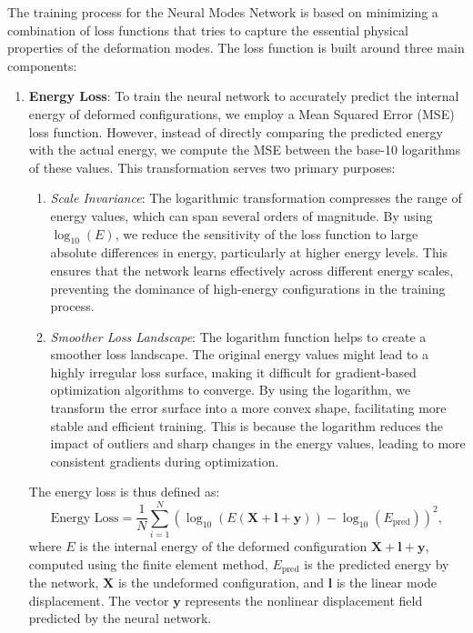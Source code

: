 The training process for the Neural Modes Network is based on minimizing a combination of loss functions that tries to capture the essential physical properties of the deformation modes. The loss function is built around three main components:
\begin{enumerate}
    \item \textbf{Energy Loss}: To train the neural network to accurately predict the internal energy of deformed configurations, we employ a Mean Squared Error (MSE) loss function.  However, instead of directly comparing the predicted energy with the actual energy, we compute the MSE between the base-10 logarithms of these values. This transformation serves two primary purposes:

    \begin{enumerate}
        \item \textit{Scale Invariance}:  The logarithmic transformation compresses the range of energy values, which can span several orders of magnitude. By using $\log_{10}(E)$, we reduce the sensitivity of the loss function to large absolute differences in energy, particularly at higher energy levels. This ensures that the network learns effectively across different energy scales, preventing the dominance of high-energy configurations in the training process.

        \item \textit{Smoother Loss Landscape}: The logarithm function helps to create a smoother loss landscape.  The original energy values might lead to a highly irregular loss surface, making it difficult for gradient-based optimization algorithms to converge. By using the logarithm, we transform the error surface into a more convex shape, facilitating more stable and efficient training.  This is because the logarithm reduces the impact of outliers and sharp changes in the energy values, leading to more consistent gradients during optimization.
    \end{enumerate}

    The energy loss is thus defined as:
    \begin{equation}
        \text{Energy Loss} = \frac{1}{N} \sum_{i=1}^N (\log_{10}(E(\bm{X} + \bm{l} + \bm{y})) - \log_{10}(E_{\text{pred}}))^2,
    \end{equation}
    where \( E \) is the internal energy of the deformed configuration \( \bm{X} + \bm{l} + \bm{y} \), computed using the finite element method, \( E_{\text{pred}} \) is the predicted energy by the network, \( \bm{X} \) is the undeformed configuration, and \( \bm{l} \) is the linear mode displacement.  The vector \(\bm{y}\) represents the nonlinear displacement field predicted by the neural network.
    

\end{enumerate}
